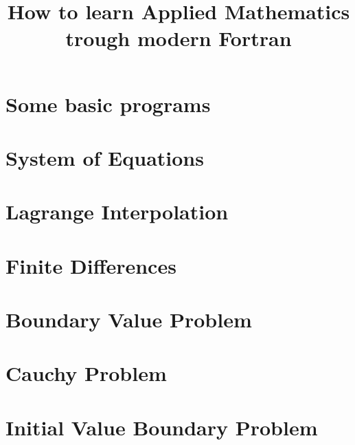 \documentclass{report}
\title{How to learn Applied Mathematics trough modern Fortran} %
\date{} %
\begin{document}
\maketitle

\newpage

\tableofcontents

\newpage



\chapter{Some basic programs}



\chapter{System of Equations}


\chapter{Lagrange Interpolation}


\chapter{Finite Differences}




\chapter{Boundary Value Problem}


\chapter{Cauchy Problem}


\chapter{Initial Value Boundary Problem}

\end{document}
